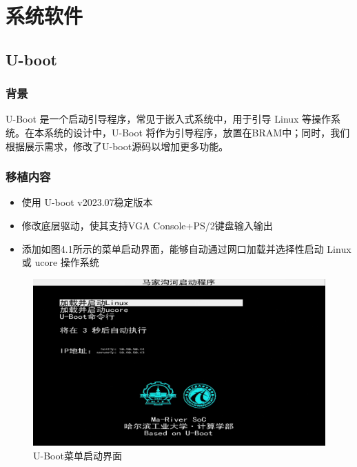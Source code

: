 \chapter{系统软件}

\section{U-boot}

\subsection{背景}
U-Boot 是一个启动引导程序，常见于嵌入式系统中，用于引导 Linux 等操作系统。在本系统的设计中，U-Boot 将作为引导程序，放置在BRAM中；同时，我们根据展示需求，修改了U-boot源码以增加更多功能。

\subsection{移植内容}

\begin{itemize}
    \item 使用 U-boot v2023.07稳定版本
    \item 修改底层驱动，使其支持VGA Console+PS/2键盘输入输出
    \item 添加如图4.1所示的菜单启动界面，能够自动通过网口加载并选择性启动 Linux 或 ucore 操作系统
\end{itemize}

\begin{figure}[htb] %
\centering %
\includegraphics[width=13cm]{img/uboot.png}
\caption{U-Boot菜单启动界面} %
\label{pic2} %
\end{figure}

